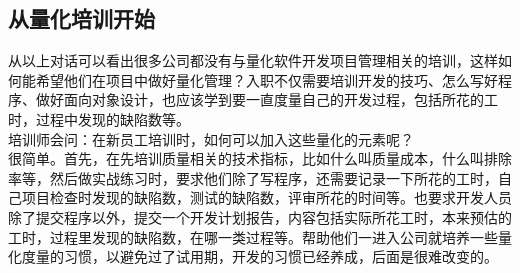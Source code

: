 
\hypertarget{ux4eceux91cfux5316ux57f9ux8badux5f00ux59cb}{%
\subsection{从量化培训开始}\label{ux4eceux91cfux5316ux57f9ux8badux5f00ux59cb}}

从以上对话可以看出很多公司都没有与量化软件开发项目管理相关的培训，这样如何能希望他们在项目中做好量化管理？入职不仅需要培训开发的技巧、怎么写好程序、做好面向对象设计，也应该学到要一直度量自己的开发过程，包括所花的工时，过程中发现的缺陷数等。\\
培训师会问：在新员工培训时，如何可以加入这些量化的元素呢？\\
很简单。首先，在先培训质量相关的技术指标，比如什么叫质量成本，什么叫排除率等，然后做实战练习时，要求他们除了写程序，还需要记录一下所花的工时，自己项目检查时发现的缺陷数，测试的缺陷数，评审所花的时间等。也要求开发人员除了提交程序以外，提交一个开发计划报告，内容包括实际所花工时，本来预估的工时，过程里发现的缺陷数，在哪一类过程等。帮助他们一进入公司就培养一些量化度量的习惯，以避免过了试用期，开发的习惯已经养成，后面是很难改变的。\\

